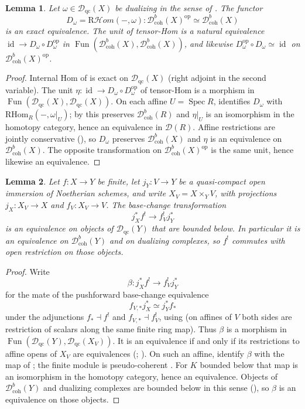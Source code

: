\documentclass[11pt]{amsart}
\newcommand{\cD}{\mathcal{D}}
\newcommand{\id}{\operatorname{id}}
\newcommand{\op}{{\operatorname{op}}}
\newcommand{\Spec}{\operatorname{Spec}}
\DeclareMathOperator{\Fun}{\mathrm{Fun}}
\newcommand{\RHom}{\mathrm R\mathcal Hom}
\newcommand{\Dqc}{\mathcal D_{\mathrm{qc}}}
\newcommand{\Dbc}{\mathcal D^b_{\mathrm{coh}}}
\theoremstyle{plain}
\newtheorem{lemma}[lemma]{Lemma}
\theoremstyle{definition}
\numberwithin{equation}{section}
\begin{document}
\begin{lemma}\label{lem:grothendieck}
Let $\omega\in\Dqc(X)$ be dualizing in the sense of .
The functor
\begin{equation}\label{eq:underlying-dual}
 D_\omega=\RHom(-,\omega):\Dbc(X)^{\op}\simeq\Dbc(X)
\end{equation}
is an exact equivalence.
The unit of tensor-Hom is a natural equivalence $\id\to D_\omega\circ D_\omega^{\op}$ in $\Fun(\Dbc(X),\Dbc(X))$, and likewise $D_\omega^{\op}\circ D_\omega\simeq\id$ on $\Dbc(X)^{\op}$.
\end{lemma}
\begin{proof}
Internal Hom of  is exact on $\Dqc(X)$ (right adjoint in the second variable).
The unit $\eta:\id\to D_\omega\circ D_\omega^{\op}$ of tensor-Hom is a morphism in $\Fun(\Dqc(X),\Dqc(X))$.
On each affine $U=\Spec R$,  identifies $D_\omega$ with $\mathrm{RHom}_R(-,\omega|_U)$; by \cite[\href{https://stacks.math.columbia.edu/tag/0A7C}{Tag 0A7C}]{SP} this preserves $\mathcal D^b_{\mathrm{coh}}(R)$ and $\eta|_U$ is an isomorphism in the homotopy category, hence an equivalence in $\cD(R)$.
Affine restrictions are jointly conservative (), so $D_\omega$ preserves $\Dbc(X)$ and $\eta$ is an equivalence on $\Dbc(X)$.
The opposite transformation on $\Dbc(X)^{\op}$ is the same unit, hence likewise an equivalence.
\end{proof}

\begin{lemma}\label{lem:open-rhom}
Let $f:X\to Y$ be finite, let $j_Y:V\to Y$ be a quasi-compact open immersion of Noetherian schemes, and write $X_V=X\times_Y V$, with projections $j_X:X_V\to X$ and $f_V:X_V\to V$.
The base-change transformation
\[
 j_X^*f^!\to f_V^!j_Y^*
\]
is an equivalence on objects of $\Dqc(Y)$ that are bounded below.
In particular it is an equivalence on $\Dbc(Y)$ and on dualizing complexes, so $f^!$ commutes with open restriction on those objects.
\end{lemma}
\begin{proof}
Write
\[
 \beta:j_X^*f^!\to f_V^!j_Y^*
\]
for the mate of the pushforward base-change equivalence
\[
 f_{V,*}j_X^*\simeq j_Y^*f_*
\]
under the adjunctions $f_*\dashv f^!$ and $f_{V,*}\dashv f_V^!$, using  (on affines of $V$ both sides are restriction of scalars along the same finite ring map).
Thus $\beta$ is a morphism in $\Fun(\Dqc(Y),\Dqc(X_V))$.
It is an equivalence if and only if its restrictions to affine opens of $X_V$ are equivalences (; \cite[\href{https://kerodon.net/tag/01DK}{Tag 01DK}]{Kerodon}).
On such an affine,  identify $\beta$ with the map of \cite[\href{https://stacks.math.columbia.edu/tag/0A6A}{Tag 0A6A(3)}]{SP}; the finite module is pseudo-coherent \cite[\href{https://stacks.math.columbia.edu/tag/066E}{Tag 066E(3)}]{SP}.
For $K$ bounded below that map is an isomorphism in the homotopy category, hence an equivalence.
Objects of $\Dbc(Y)$ and dualizing complexes are bounded below in this sense (), so $\beta$ is an equivalence on those objects.
\end{proof}
\end{document}
